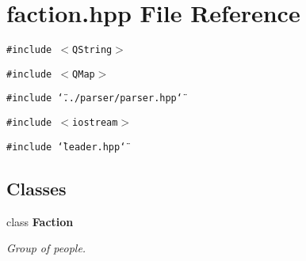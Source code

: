 \section{faction.hpp File Reference}
\label{faction_8hpp}
{\tt \#include $<$QString$>$}\par
{\tt \#include $<$QMap$>$}\par
{\tt \#include \char`\"{}../parser/parser.hpp\char`\"{}}\par
{\tt \#include $<$iostream$>$}\par
{\tt \#include \char`\"{}leader.hpp\char`\"{}}\par
\subsection*{Classes}
\begin{CompactItemize}
\item 
class {\bf Faction}
\begin{CompactList}\small\item\em Group of people. \item\end{CompactList}\end{CompactItemize}
